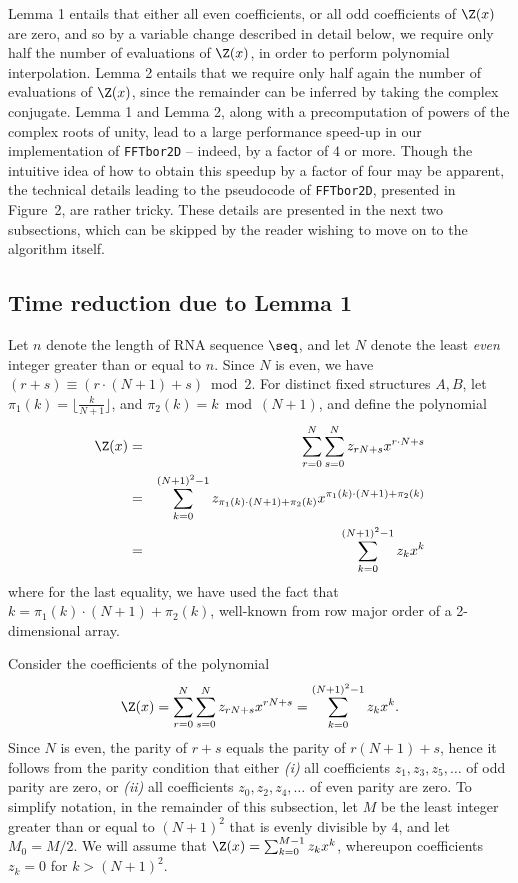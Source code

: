 Lemma 1 entails that either all even coefficients, or all odd coefficients
of $\Z(x)$ are zero, and so by a variable change described in detail below,
we require only half the number of evaluations of $\Z(x)$, in order to perform
polynomial interpolation.
Lemma 2 entails that we require only half again the number of evaluations of
$\Z(x)$, since the remainder can be inferred by taking the complex conjugate.
Lemma 1 and Lemma 2, along with a
precomputation of powers of the complex roots of unity, lead to a
large performance speed-up in our implementation of {\tt FFTbor2D} -- indeed,
by a factor of $4$ or more. Though the intuitive idea of how to obtain
this speedup by a factor of four may be apparent, the technical details
leading to the pseudocode of {\tt FFTbor2D}, presented in
Figure~2, are rather tricky. These details
are presented in the next two subsections, which can be skipped by the
reader wishing to move on to the algorithm itself.
\medskip

\subsection{Time reduction due to Lemma 1}
Let $n$ denote the length of RNA sequence $\seq$, and let $N$ denote the
least {\em even} integer greater than or equal to $n$. Since $N$ is even,
we have $(r+s) \equiv (r\cdot(N+1)+s) \bmod 2$. For distinct
fixed structures $A,B$, let
$\pi_1(k) = \lfloor \frac{k}{N+1} \rfloor$, and
$\pi_2(k) = k \bmod (N+1)$, and define the polynomial
\begin{eqnarray*}
\label{eqn:polynomialPeter}
\Z(x) &=& \sum_{r=0}^{N} \sum_{s=0}^{N} z_{rN+s} x^{r\cdot N + s}\\
&=&
\sum_{k=0}^{(N+1)^2-1} z_{\pi_1(k)\cdot (N+1) + \pi_2(k)}
x^{\pi_1(k)\cdot (N+1) + \pi_2(k)}\\
&=&
\sum_{k=0}^{(N+1)^2-1} z_k x^k
\end{eqnarray*}
where for the last equality, we have used the fact that
$k = \pi_1(k)\cdot (N+1) + \pi_2(k)$, well-known from
row major order of a 2-dimensional array.

Consider the coefficients of the polynomial
\begin{eqnarray}
\label{eqn:yannPolynomialN}
\Z(x) = \sum_{r=0}^{N} \sum_{s=0}^{N} z_{rN+s} x^{rN+s}
= \sum_{k=0}^{(N+1)^2-1} z_k x^k.
\end{eqnarray}
Since $N$ is even, the parity of $r+s$ equals the parity of
$r(N+1)+s$, hence  it follows from the parity condition that either
{\em (i)} all coefficients $z_1,z_3,z_5,\ldots$ of odd parity are zero,
or {\em (ii)} all coefficients $z_0,z_2,z_4,\ldots$ of even parity are zero.
To simplify notation, in the remainder of this subsection, let $M$ be
the least integer greater than or equal to $(N+1)^2$ that is evenly divisible
by $4$, and let $M_0=M/2$. We will assume that $\Z(x) = \sum_{k=0}^{M-1}
z_k x^k$, whereupon coefficients $z_k=0$ for $k>(N+1)^2$.
\smallskip


